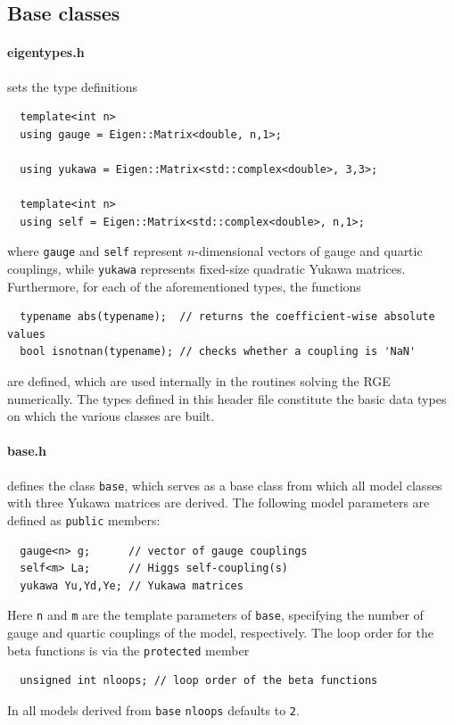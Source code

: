 \documentclass[11pt,a4paper]{article}
\begin{document}
\subsection{\label{sec::base} Base classes}
\paragraph{eigentypes.h}
sets the type definitions
\begin{lstlisting}
  template<int n>
  using gauge = Eigen::Matrix<double, n,1>;
   
  using yukawa = Eigen::Matrix<std::complex<double>, 3,3>;

  template<int n>
  using self = Eigen::Matrix<std::complex<double>, n,1>;
\end{lstlisting}
where \texttt{gauge} and \texttt{self} represent $n$-dimensional vectors of gauge and quartic couplings, while \texttt{yukawa} represents fixed-size quadratic Yukawa matrices.
Furthermore, for each of the aforementioned types, the functions
\begin{lstlisting}
  typename abs(typename);  // returns the coefficient-wise absolute values
  bool isnotnan(typename); // checks whether a coupling is 'NaN'
\end{lstlisting}
are defined, which are used internally in the routines solving the RGE numerically.
The types defined in this header file constitute the basic data types on which the various classes are built.

\paragraph{base.h}
defines the class \texttt{base}, which serves as a base class from which all model classes with three Yukawa matrices are derived. The following model parameters are defined as \texttt{public} members:
\begin{lstlisting}
  gauge<n> g;      // vector of gauge couplings
  self<m> La;      // Higgs self-coupling(s)
  yukawa Yu,Yd,Ye; // Yukawa matrices
\end{lstlisting}
Here \texttt{n} and \texttt{m} are the template parameters of \texttt{base}, specifying the number of gauge and quartic couplings of the model, respectively.
The loop order for the beta functions is via the \texttt{protected} member
\begin{lstlisting}
  unsigned int nloops; // loop order of the beta functions
\end{lstlisting}
In all models derived from \texttt{base} \texttt{nloops} defaults to \texttt{2}.
\end{document}
